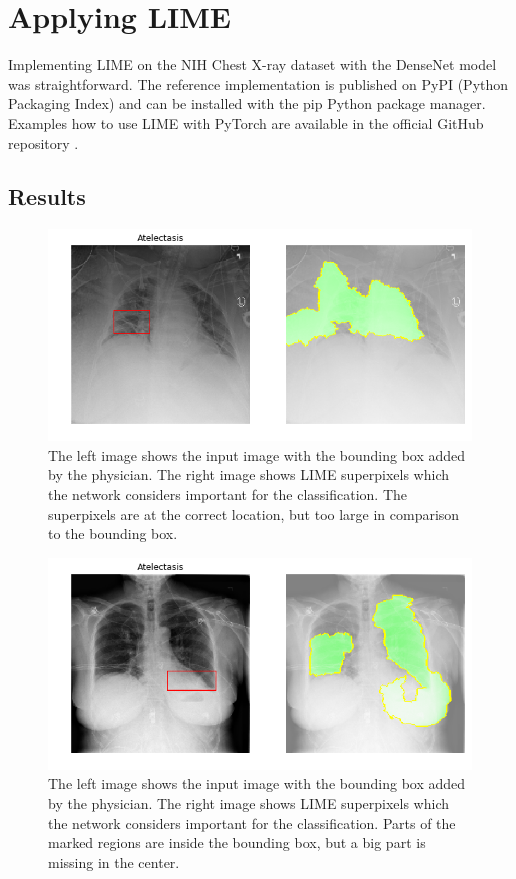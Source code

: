 \section{Applying LIME}
Implementing LIME on the NIH Chest X-ray dataset with the DenseNet model was straightforward. The reference implementation is published on PyPI (Python Packaging Index) and can be installed with the pip Python package manager. Examples how to use LIME with PyTorch are available in the official GitHub repository \cite{limegithub}.


\subsection{Results}
\begin{figure}[H]
\centering
\includegraphics[width=12cm]{chapters/03_classification/images/lime_0.png}
\caption{The left image shows the input image with the bounding box added by the physician. The right image shows LIME superpixels which the network considers important for the classification. The superpixels are at the correct location, but too large in comparison to the bounding box.}
\label{lime_example_1}
\end{figure}

\begin{figure}[H]
\centering
\includegraphics[width=12cm]{chapters/03_classification/images/lime_2.png}
\caption{The left image shows the input image with the bounding box added by the physician. The right image shows LIME superpixels which the network considers important for the classification. Parts of the marked regions are inside the bounding box, but a big part is missing in the center.}
\label{lime_example_2}
\end{figure}

